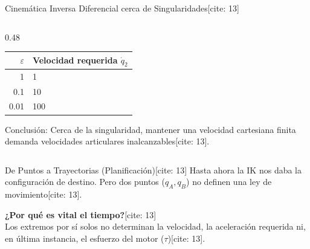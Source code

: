 \documentclass[aspectratio=169, xcolor={table,xcdraw}]{beamer}
\begin{document}
\begin{frame}{Cinemática Inversa Diferencial cerca de Singularidades[cite: 13]}
\begin{columns}[T]
\begin{column}{0.48\textwidth}
            \begin{center}
                \small
                \begin{tabular}{r | l}
                $\varepsilon$ & Velocidad requerida $\dot{q}_2$ \\ \hline
                1 & 1 \\
                0.1 & 10 \\
                0.01 & 100
                \end{tabular}
            \end{center}
            \begin{tcolorbox}[colback=yellow!10, colframe=orange, title=Significado Físico, boxsep=0mm, top=1mm, bottom=1mm, left=1mm, right=1mm]
                \small Conclusión: Cerca de la singularidad, mantener una velocidad cartesiana finita demanda velocidades articulares inalcanzables[cite: 13].
            \end{tcolorbox}
        \end{column}
    \end{columns}
\end{frame}

\begin{frame}{De Puntos a Trayectorias (Planificación)[cite: 13]}
    Hasta ahora la IK nos daba la configuración de destino. Pero dos puntos ($q_A, q_B$) no definen una ley de movimiento[cite: 13].
    
    \vfill
    \begin{center}
    \end{center}
    
    \vfill
    \textbf{¿Por qué es vital el tiempo?}[cite: 13] \\
    Los extremos por sí solos no determinan la velocidad, la aceleración requerida ni, en última instancia, el esfuerzo del motor ($\tau$)[cite: 13].
\end{frame}
\end{document}
